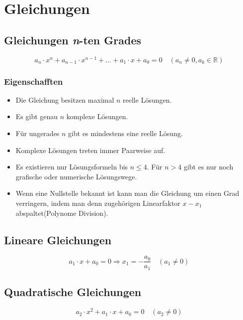 \section{Gleichungen}
\subsection{Gleichungen \emph{n}-ten Grades}

 \begin{equation*}
  a_n\cdot x^n+a_{n-1}\cdot x^{n-1}+\ldots+a_1\cdot x+a_0=0\quad (a_n\neq0,a_k\in\mathbb{R})
 \end{equation*}

\subsubsection*{Eigenschafften}
\begin{itemize}
 \item Die Gleichung besitzen maximal $n$ reelle Lösungen.
\item Es gibt genau $n$ komplexe Lösungen.
\item Für ungerades $n$ gibt es mindestens eine reelle Lösung.
\item Komplexe Lösungen treten immer Paarweise auf.
\item Es existieren nur Lösungsformeln bis $n\leq 4$. Für $n>4$ gibt es nur noch grafische oder numerische Lösungswege.
\item Wenn eine Nullstelle bekannt ist kann man die Gleichung um einen Grad verringern, indem man denn zugehörigen Linearfaktor $x -x_1$ abspaltet(Polynome Division).
\end{itemize}

\subsection{Lineare Gleichungen}
 \begin{equation*}
  a_1\cdot x+a_0=0 \Rightarrow x_1=-\frac{a_0}{a_1}\quad (a_1\neq 0)
 \end{equation*}

\subsection{Quadratische Gleichungen}
 \begin{equation*}
  a_2\cdot x^2+a_1\cdot x+a_0=0\quad (a_2\neq0)
 \end{equation*}

